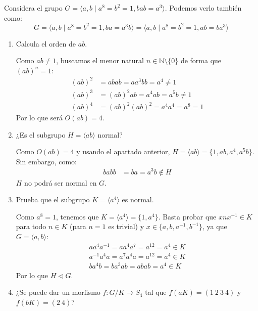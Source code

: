 \documentclass[12pt]{article}
\begin{document}
    \begin{ejercicio}[2.5 puntos]
        Considera el grupo $G=\langle a,b\mid a^8 = b^2 = 1, bab = a^3 \rangle $. \newline
        Podemos verlo también como:
        \begin{equation*}
            G = \langle a,b \mid a^8 = b^2 = 1, ba = a^3b \rangle  = \langle a,b\mid a^8 = b^2 = 1, ab = ba^3 \rangle 
        \end{equation*}
        \begin{enumerate}[label=(\alph*)]
            \item Calcula el orden de $ab$.

                Como $ab \neq 1$, buscamos el menor natural $n\in \mathbb{N}\setminus \{0\}$ de forma que ${(ab)}^{n} = 1$:
                \begin{align*}
                    {(ab)}^{2} &= abab = aa^3bb = a^4 \neq 1 \\
                    {(ab)}^{3} &= {(ab)}^{2}ab = a^4ab = a^5b \neq 1 \\
                    {(ab)}^{4} &= {(ab)}^{2}{(ab)}^{2} = a^4a^4 = a^8 = 1
                \end{align*}
                Por lo que será $O(ab) = 4$.
            \item ¿Es el subgrupo $H = \langle ab \rangle $ normal?

                Como $O(ab) = 4$ y usando el apartado anterior, $H= \langle ab \rangle = \{1, ab, a^4, a^5b\}$. Sin embargo, como:
                \begin{align*}
                    babb &= ba = a^3b \notin H
                \end{align*}
                $H$ no podrá ser normal en $G$.
            \item Prueba que el subgrupo $K = \langle a^4 \rangle $ es normal.

                Como $a^8 = 1$, tenemos que $K = \langle a^4 \rangle = \{1,a^4\} $.
                Basta probar que $xnx^{-1}\in K$ para todo $n\in K$ (para $n=1$ es trivial) y $x\in \{a,b,a^{-1},b^{-1}\}$, ya que $G = \langle a,b \rangle $:
                \begin{align*}
                    aa^4a^{-1} = aa^4a^7 = a^{12}= a^4 \in K \\
                    a^{-1}a^4a = a^7a^4a = a^{12} = a^4 \in K \\
                    ba^4b = ba^3ab = abab = a^4 \in K
                \end{align*}
                Por lo que $H\lhd G$.
            \item ¿Se puede dar un morfismo $f:G/K\to S_4$ tal que $f(aK)=(1\ 2\ 3\ 4)$ y $f(bK) = (2\ 4)$?


\end{enumerate}
\end{ejercicio}
\end{document}
